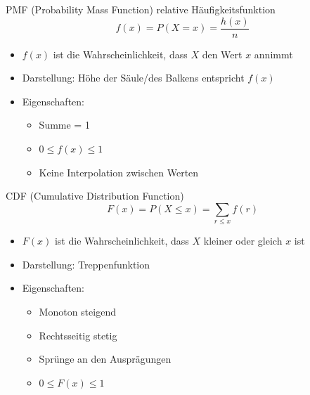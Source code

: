 \begin{corollary}{PMF (Probability Mass Function)} relative Häufigkeitsfunktion
    $$f(x) = P(X = x) = \frac{h(x)}{n}$$
    \begin{itemize}
        \item $f(x)$ ist die Wahrscheinlichkeit, dass $X$ den Wert $x$ annimmt
        \item Darstellung: Höhe der Säule/des Balkens entspricht $f(x)$
        \item Eigenschaften:
        \begin{itemize}
            \item Summe = 1
            \item $0 \leq f(x) \leq 1$
            \item Keine Interpolation zwischen Werten
        \end{itemize}
    \end{itemize}
\end{corollary}

\begin{corollary}{CDF (Cumulative Distribution Function)}
    $$F(x) = P(X \leq x) = \sum_{r\leq x} f(r)$$
    \begin{itemize}
        \item $F(x)$ ist die Wahrscheinlichkeit, dass $X$ kleiner oder gleich $x$ ist
        \item Darstellung: Treppenfunktion
        \item Eigenschaften:
        \begin{itemize}
            \item Monoton steigend
            \item Rechtsseitig stetig
            \item Sprünge an den Ausprägungen
            \item $0 \leq F(x) \leq 1$
        \end{itemize}
    \end{itemize}
\end{corollary}

